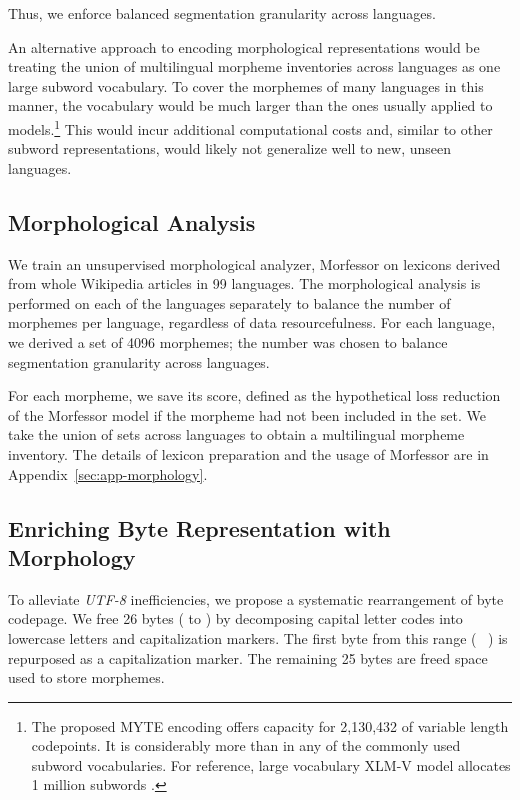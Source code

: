 Thus, we enforce balanced segmentation granularity across languages.

An alternative approach to encoding morphological representations would be treating the union of multilingual morpheme inventories across languages as one large subword vocabulary. To cover the morphemes of many languages in this manner, the vocabulary would be much larger than the ones usually applied to models.\footnote{The proposed \textsc{MYTE} encoding offers capacity for 2,130,432 of variable length codepoints. It is considerably more than in any of the commonly used subword vocabularies. For reference, large vocabulary XLM-V model allocates 1 million subwords \cite{liang-etal-2023-xlm}.} This would incur additional computational costs and, similar to other subword representations, would likely not generalize well to new, unseen languages.

\subsection{Morphological Analysis}
\label{sec:morph-analysis}

We train an unsupervised morphological analyzer, Morfessor \cite{smit-etal-2014-morfessor} on lexicons derived from whole Wikipedia articles in 99 languages. The morphological analysis is performed on each of the languages separately to balance the number of morphemes per language, regardless of data resourcefulness. For each language, we derived a set of 4096 morphemes; the number was chosen to balance segmentation granularity across languages.

For each morpheme, we save its score, defined as the hypothetical loss reduction of the Morfessor model if the morpheme had not been included in the set. We take the union of sets across languages to obtain a multilingual morpheme inventory. The details of lexicon preparation and the usage of Morfessor are in Appendix~\ref{sec:app-morphology}.

\subsection{Enriching Byte Representation with Morphology} 
\label{sec:morphology-enriching}

To alleviate \emph{UTF-8} inefficiencies, we propose a systematic rearrangement of byte codepage. We free 26 bytes (  to  ) by decomposing capital letter codes into lowercase letters and capitalization markers. The first byte from this range (~ ) is repurposed as a capitalization marker. The remaining 25 bytes are freed space used to store morphemes. 

